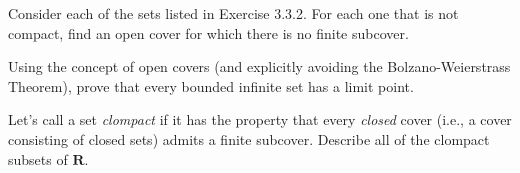 \begin{exercise}
  Consider each of the sets listed in Exercise 3.3.2. For each one that is not compact, find an open cover for which there is no finite subcover.
\end{exercise}

\begin{solution}
  \TODO
\end{solution}


\begin{exercise}
  Using the concept of open covers (and explicitly avoiding the Bolzano-Weierstrass Theorem), prove that every bounded infinite set has a limit point.
\end{exercise}

\begin{solution}
  \TODO
\end{solution}

\begin{exercise}
  Let's call a set \emph{clompact} if it has the property that every \emph{closed} cover (i.e., a cover consisting of closed sets) admits a finite subcover. Describe all of the clompact subsets of $\mathbf{R}$.
\end{exercise}

\begin{solution}
  \TODO
\end{solution}

